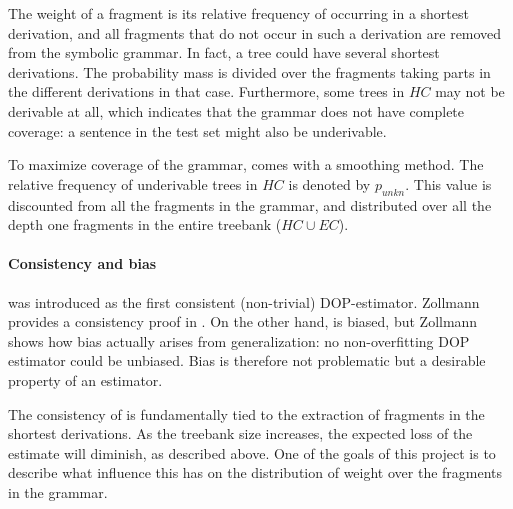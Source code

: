 The weight of a fragment is its relative frequency of occurring in a shortest derivation, and all fragments that do not occur in such a derivation are removed from the symbolic grammar. In fact, a tree could have several shortest derivations. The probability mass is divided over the fragments taking parts in the different derivations in that case. Furthermore, some trees in $HC$ may not be derivable at all, which indicates that the grammar does not have complete coverage: a sentence in the test set might also be underivable. 

To maximize coverage of the grammar, \dops{} comes with a smoothing method. The relative frequency of underivable trees in $HC$ is denoted by $p_{unkn}$. This value is discounted from all the fragments in the grammar, and distributed over all the depth one fragments in the entire treebank ($HC\cup EC$).


\paragraph{Consistency and bias}
\dops{} was introduced as the first consistent (non-trivial) DOP-estimator. Zollmann provides a consistency proof in . On the other hand, \dops{} is  biased, but Zollmann shows how bias actually arises from generalization: no non-overfitting DOP estimator could be unbiased. Bias is therefore not problematic but a desirable property of an estimator.

The consistency of \dops{} is fundamentally tied to the extraction of fragments in the shortest derivations. As the treebank size increases, the expected loss of the estimate will diminish, as described above. One of the goals of this project is to describe what influence this has on the distribution of weight over the fragments in the grammar.

